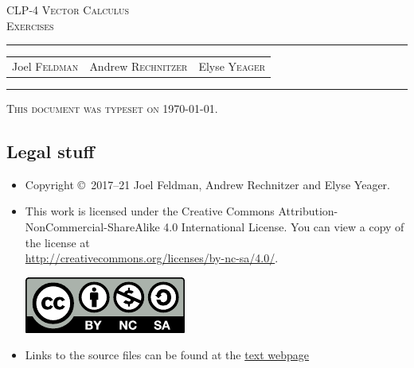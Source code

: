 \documentclass[12pt,letterpaper, openany]{book}
\begin{document}
\setcounter{page}{0}


\begin{titlepage}
\begin{center}
\textsc{\LARGE
CLP-4 Vector Calculus \\[2ex]
Exercises
}\\[2ex]

\vspace{5ex}
\hrule
\vspace{5ex}

\begin{tabular}{ccc}
\large  Joel \textsc{Feldman}
& \large \qquad Andrew \textsc{Rechnitzer}
&\large  \qquad Elyse \textsc{Yeager}
\end{tabular}

\end{center}
\vspace{2ex}
\hrule

\vfill
\textsc{This document was typeset on \today.}
\end{titlepage}

\subsection*{Legal stuff}
\begin{itemize}
 \item Copyright \copyright\ 2017--21 Joel Feldman, Andrew Rechnitzer and Elyse Yeager.

\item This work is licensed under the
Creative Commons Attribution-NonCommercial-ShareAlike 4.0 International
License. You can view a copy of the license at \\
\url{http://creativecommons.org/licenses/by-nc-sa/4.0/}.
\begin{center}
 \includegraphics{by-nc-sa.pdf}
\end{center}


\item Links to the source files can be found at the \href{http://www.math.ubc.ca/~CLP/index.html}{text webpage}
\end{itemize}

\newpage
\end{document}
